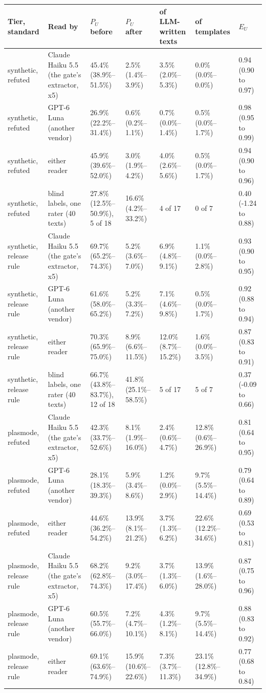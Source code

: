 \begin{tabular}{p{2.2cm}p{3cm}p{2cm}p{2cm}p{1.7cm}p{1.7cm}p{1.9cm}}
\toprule
\textbf{Tier, standard} & \textbf{Read by} & \textbf{$P_U$ before} & \textbf{$P_U$ after} & \textbf{of LLM-written texts} & \textbf{of templates} & \textbf{$E_U$} \\
\midrule
synthetic, refuted & Claude Haiku 5.5 (the gate's extractor, x5) & 45.4\% (38.9\%–51.5\%) & 2.5\% (1.4\%–3.9\%) & 3.5\% (2.0\%–5.3\%) & 0.0\% (0.0\%–0.0\%) & 0.94 (0.90 to 0.97) \\
synthetic, refuted & GPT-6 Luna (another vendor) & 26.9\% (22.2\%–31.4\%) & 0.6\% (0.2\%–1.1\%) & 0.7\% (0.0\%–1.4\%) & 0.5\% (0.0\%–1.7\%) & 0.98 (0.95 to 0.99) \\
synthetic, refuted & either reader & 45.9\% (39.6\%–52.0\%) & 3.0\% (1.9\%–4.2\%) & 4.0\% (2.6\%–5.6\%) & 0.5\% (0.0\%–1.7\%) & 0.94 (0.90 to 0.96) \\
synthetic, refuted & blind labels, one rater (40 texts) & 27.8\% (12.5\%–50.9\%), 5 of 18 & 16.6\% (4.2\%–33.2\%) & 4 of 17 & 0 of 7 & 0.40 (-1.24 to 0.88) \\
synthetic, release rule & Claude Haiku 5.5 (the gate's extractor, x5) & 69.7\% (65.2\%–74.3\%) & 5.2\% (3.6\%–7.0\%) & 6.9\% (4.8\%–9.1\%) & 1.1\% (0.0\%–2.8\%) & 0.93 (0.90 to 0.95) \\
synthetic, release rule & GPT-6 Luna (another vendor) & 61.6\% (58.0\%–65.2\%) & 5.2\% (3.3\%–7.2\%) & 7.1\% (4.6\%–9.8\%) & 0.5\% (0.0\%–1.7\%) & 0.92 (0.88 to 0.94) \\
synthetic, release rule & either reader & 70.3\% (65.9\%–75.0\%) & 8.9\% (6.6\%–11.5\%) & 12.0\% (8.7\%–15.2\%) & 1.6\% (0.0\%–3.5\%) & 0.87 (0.83 to 0.91) \\
synthetic, release rule & blind labels, one rater (40 texts) & 66.7\% (43.8\%–83.7\%), 12 of 18 & 41.8\% (25.1\%–58.5\%) & 5 of 17 & 5 of 7 & 0.37 (-0.09 to 0.66) \\
plasmode, refuted & Claude Haiku 5.5 (the gate's extractor, x5) & 42.3\% (33.7\%–52.6\%) & 8.1\% (1.9\%–16.0\%) & 2.4\% (0.6\%–4.7\%) & 12.8\% (0.6\%–26.9\%) & 0.81 (0.64 to 0.95) \\
plasmode, refuted & GPT-6 Luna (another vendor) & 28.1\% (18.3\%–39.3\%) & 5.9\% (3.4\%–8.6\%) & 1.2\% (0.0\%–2.9\%) & 9.7\% (5.5\%–14.4\%) & 0.79 (0.64 to 0.89) \\
plasmode, refuted & either reader & 44.6\% (36.2\%–54.2\%) & 13.9\% (8.1\%–21.2\%) & 3.7\% (1.3\%–6.2\%) & 22.6\% (12.2\%–34.6\%) & 0.69 (0.53 to 0.81) \\
plasmode, release rule & Claude Haiku 5.5 (the gate's extractor, x5) & 68.2\% (62.8\%–74.3\%) & 9.2\% (3.0\%–17.4\%) & 3.7\% (1.3\%–6.0\%) & 13.9\% (1.6\%–28.0\%) & 0.87 (0.75 to 0.96) \\
plasmode, release rule & GPT-6 Luna (another vendor) & 60.5\% (55.7\%–66.0\%) & 7.2\% (4.7\%–10.1\%) & 4.3\% (1.2\%–8.1\%) & 9.7\% (5.5\%–14.4\%) & 0.88 (0.83 to 0.92) \\
plasmode, release rule & either reader & 69.1\% (63.6\%–74.9\%) & 15.9\% (10.6\%–22.6\%) & 7.3\% (3.7\%–11.3\%) & 23.1\% (12.8\%–34.9\%) & 0.77 (0.68 to 0.84) \\
\bottomrule
\end{tabular}
